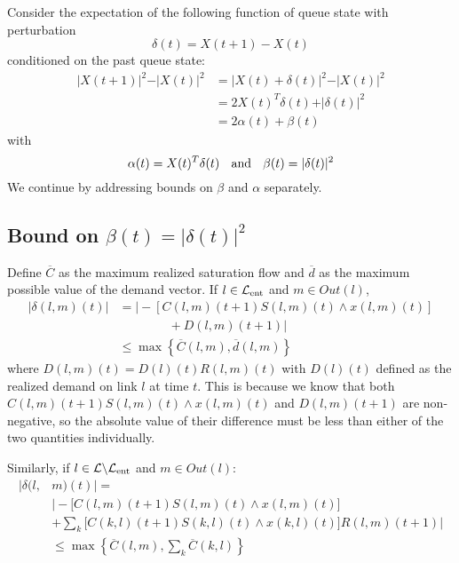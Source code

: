 \label{app_oldproof}

Consider the expectation of the following function of queue state with perturbation 
\begin{equation} \label{delta_def}
\delta(t) = X(t+1) - X(t)
\end{equation}  
conditioned on the past queue state:
\begin{align}
\vert X(t+1) \vert^2  - \vert X(t)\vert^2 &= \vert X(t) + \delta (t) \vert^2 - \vert X(t)\vert^2 \\
\nonumber &= 2X(t)^{T}\delta(t) + \vert \delta(t)  \vert^2 \\
\nonumber &= 2\alpha(t) + \beta(t) 
\end{align}
with 
\begin{equation} \label{alpha_beta_defs}
\alpha(t)  = X(t)^{T}\delta(t)  \text{   \; and \;  }\beta(t) = \vert \delta (t) \vert^{2}
\end{equation}
We continue by addressing bounds on $\beta$ and $\alpha$ separately. 

\subsection*{Bound on $\beta(t) = \vert \delta (t)\vert^{2}$}
Define $\overline{C}$ as the maximum realized saturation flow and $\overline{d}$ as the maximum possible value of the demand vector. 
If $l \in \mathcal{L}_{\text{ent}}$ and $m \in Out(l)$,
\begin{align} \nonumber
\big| \delta(l,m)(t)  \big| &= \bigg| -[C(l,m)(t+1)S(l,m)(t) \wedge x(l,m)(t)]  \\ \nonumber
&\qquad \qquad + D(l,m)(t+1) \bigg| \\
& \leq \max\left\{  \overline{C}(l,m) , \overline d (l,m) \right\} \label{deltabound1}
\end{align}
where $D(l,m)(t)  = D(l) (t) R(l,m)(t)$ with $D(l)(t)$ defined as the realized demand on link $l$ at time $t$. 
This is because we know that both $C(l,m)(t+1)S(l,m)(t) \wedge x(l,m)(t)$ and $D(l,m)(t+1)$ are non-negative, so the absolute value of their difference must be less than either of the two quantities individually. 

Similarly, if $l \in \mathcal{L}\backslash\mathcal{L}_{\text{ent}}$ and $m \in Out(l)$:
\begin{align} \nonumber  
\big | \delta(l,&m) (t)  \big |  = \\ \label{deltabound}
 & \bigg\vert-\big[C(l,m)(t+1)S(l,m)(t) \wedge x(l,m)(t)\big]  \\  \nonumber
 & + \sum_{k}\big[C(k,l)(t+1)S(k,l)(t) \wedge x(k,l)(t)\big] R(l,m)(t+1)\bigg\vert  \\
& \leq \max\left\{  \overline{C}(l,m) , \sum_{k} \overline{C}(k,l) \right\} \label{deltabound2}
\end{align}

